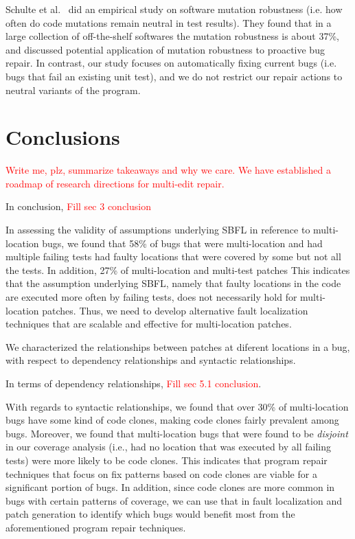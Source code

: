 \documentclass[sigconf, timestamp-false, anonymous=true]{acmart}
\newcommand\todo[1]{\textcolor{red}{#1}}
\begin{document}
Schulte et al.~\cite{schulte} did an empirical study on software mutation robustness 
(i.e. how often do code mutations remain neutral in test results). 
They found that in a large collection of off-the-shelf softwares the mutation robustness is about 37\%, 
and discussed potential application of mutation robustness to proactive bug repair. 
In contrast, our study focuses on automatically fixing current bugs (i.e. bugs that fail an existing unit test), 
and we do not restrict our repair actions to neutral variants of the program.

\section{Conclusions}
\label{sec:conclusions}

\todo{Write me, plz, summarize takeaways and why we care.  We have established a
  roadmap of research directions for multi-edit repair.}

In conclusion, \todo{Fill sec 3 conclusion}

In assessing the validity of assumptions underlying SBFL in reference to multi-location 
bugs, we found that 58\% of bugs that were multi-location and had multiple failing tests 
had faulty locations 
that were covered by some but not all the tests. In addition, 27\% of multi-location and 
multi-test patches  This indicates that the assumption underlying SBFL, namely that faulty 
locations in the code are executed more often by failing tests, does not necessarily hold 
for multi-location patches. Thus, we need to develop alternative fault localization 
techniques that are scalable and effective for multi-location patches.

We characterized the relationships between patches at diferent locations in a bug, with 
respect to dependency relationships and syntactic relationships.

In terms of dependency relationships,
\todo{Fill sec 5.1 conclusion}.

With regards to syntactic relationships, we found that over 30\%
of multi-location bugs have some kind of code clones, making code clones fairly prevalent 
among bugs. Moreover, we found that multi-location bugs that were found to be 
\emph{disjoint} in our coverage analysis (i.e., had no location that was executed by all 
failing tests) were more likely to be code clones. This indicates that program repair 
techniques that focus on fix patterns based on code clones are viable for a significant 
portion of bugs. In addition, since code clones are more common in bugs with certain 
patterns of coverage, we can use that in fault localization and patch generation to identify 
which bugs would benefit most from the aforementioned program repair techniques.
\end{document}
